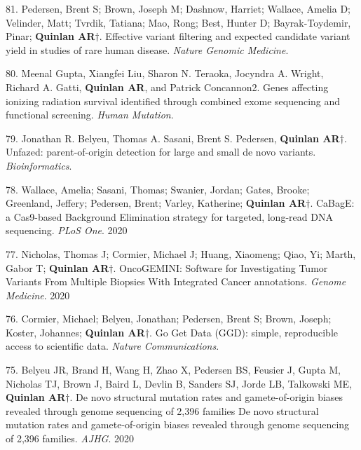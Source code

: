 \documentclass[margin,line]{cv}
\begin{document}
\begin{resume}
\begin{list}{*}{}
    \item[81.] Pedersen, Brent S; Brown, Joseph M; Dashnow, Harriet; Wallace, Amelia D; Velinder, Matt; Tvrdik, Tatiana; Mao, Rong; Best, Hunter D; Bayrak-Toydemir, Pinar; \textbf{Quinlan AR}$\dagger$.  Effective variant filtering and expected candidate variant yield in studies of rare human disease. \emph{Nature Genomic Medicine}. 

    \item[80.] Meenal Gupta, Xiangfei Liu, Sharon N. Teraoka, Jocyndra A. Wright, Richard A. Gatti, \textbf{Quinlan AR}, and Patrick Concannon2. Genes affecting ionizing radiation survival identified through combined exome sequencing and functional screening. \emph{Human Mutation}. 

    \item[79.] Jonathan R. Belyeu, Thomas A. Sasani, Brent S. Pedersen, \textbf{Quinlan AR}$\dagger$. Unfazed: parent-of-origin detection for large and small de novo variants. \emph{Bioinformatics}. 

    \item[78.] Wallace, Amelia; Sasani, Thomas; Swanier, Jordan; Gates, Brooke; Greenland, Jeffery; Pedersen, Brent; Varley, Katherine; \textbf{Quinlan AR}$\dagger$.  CaBagE: a Cas9-based Background Elimination strategy for targeted, long-read DNA sequencing. \emph{PLoS One}. 2020

    \item[77.] Nicholas, Thomas J; Cormier, Michael J; Huang, Xiaomeng; Qiao, Yi; Marth, Gabor T; \textbf{Quinlan AR}$\dagger$.  OncoGEMINI: Software for Investigating Tumor Variants From Multiple Biopsies With Integrated Cancer annotations. \emph{Genome Medicine}. 2020

    \item[76.] Cormier, Michael; Belyeu, Jonathan; Pedersen, Brent S; Brown, Joseph; Koster, Johannes; \textbf{Quinlan AR}$\dagger$. Go Get Data (GGD): simple, reproducible access to scientific data. \emph{Nature Communications}. 

    \item[75.] Belyeu JR, Brand H, Wang H, Zhao X, Pedersen BS, Feusier J, Gupta M, Nicholas TJ, Brown J, Baird L, Devlin B, Sanders SJ, Jorde LB, Talkowski ME, \textbf{Quinlan AR}$\dagger$. De novo structural mutation rates and gamete-of-origin biases revealed through genome sequencing of 2,396 families De novo structural mutation rates and gamete-of-origin biases revealed through genome sequencing of 2,396 families. \emph{AJHG}. 2020


\end{list}
\end{resume}
\end{document}
